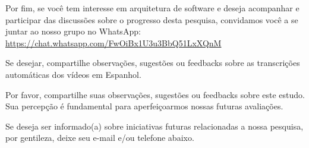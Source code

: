 Por fim, se você tem interesse em arquitetura de software e deseja acompanhar e participar 
das discussões sobre o progresso desta pesquisa, convidamos você a se juntar ao nosso 
grupo no WhatsApp: \url{https://chat.whatsapp.com/FwOiBx1U3u3BbQ51LxXQnM}

Se desejar, compartilhe observações, sugestões ou feedbacks sobre as 
transcrições automáticas dos vídeos em Espanhol.

Por favor, compartilhe suas observações, sugestões ou feedbacks sobre este
estudo. Sua percepção é fundamental para aperfeiçoarmos nossas futuras
avaliações.

Se deseja ser informado(a) sobre iniciativas futuras relacionadas a nossa
pesquisa, por gentileza, deixe seu e-mail e/ou telefone abaixo.
